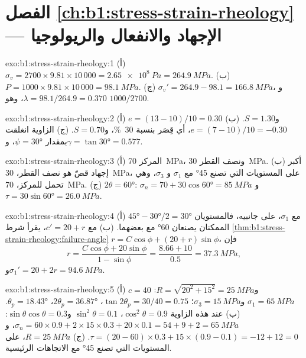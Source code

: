 \section*{الفصل \ref{ch:b1:stress-strain-rheology} --- الإجهاد والانفعال والريولوجيا}

\begin{solution}{exo:b1:stress-strain-rheology:1}
(أ) $\sigma_v = 2700\times9.81\times10\,000 = \qty{2.65e8}{Pa} = \qty{264.9}{MPa}$.
(ب) $P = 1000\times9.81\times10\,000 = \qty{98.1}{MPa}$. (ج) $\sigma_v' =
264.9 - 98.1 = \qty{166.8}{MPa}$، و$\lambda = 98.1/264.9 = 0.370$، وهو
$1000/2700$.
\end{solution}

\begin{solution}{exo:b1:stress-strain-rheology:2}
(أ) $e = (13-10)/10 = 0.30$ و$S = 1.30$. (ب) $e = (7-10)/10 = -0.30$، أي قِصَر
بنسبة \qty{30}{\percent}، و$S = 0.70$. (ج) الزاوية انغلقت بمقدار
$\psi = \ang{30}$، و$\gamma = \tan\ang{30} = 0.577$.
\end{solution}

\begin{solution}{exo:b1:stress-strain-rheology:3}
(أ) المركز \qty{70}{MPa}، ونصف القطر \qty{30}{MPa}. (ب) أكبر إجهاد قصّ هو نصف القطر، \qty{30}{MPa}، على المستويات التي تصنع \ang{45} مع $\sigma_1$ و
$\sigma_3$، وهي تحمل  للمركز، \qty{70}{MPa}. (ج)
$2\theta = \ang{60}$: $\sigma_n = 70 + 30\cos\ang{60} = \qty{85}{MPa}$ و
$\tau = 30\sin\ang{60} = \qty{26.0}{MPa}$.
\end{solution}

\begin{solution}{exo:b1:stress-strain-rheology:4}
(أ) $\ang{45} - \ang{30}/2 = \ang{30}$ مع $\sigma_1$، على جانبيه، فالمستويان الممكنان يصنعان \ang{60} مع بعضهما. (ب) مع $c' = 20 + r$، يقرأ شرط \cref{thm:b1:stress-strain-rheology:failure-angle}
$r = C\cos\phi + (20 + r)\sin\phi$، فإن
\[
  r = \frac{C\cos\phi + 20\sin\phi}{1 - \sin\phi} = \frac{8.66 + 10}{0.5}
    = \qty{37.3}{MPa},
\]
و$\sigma_1' = 20 + 2r = \qty{94.6}{MPa}$.
\end{solution}

\begin{solution}{exo:b1:stress-strain-rheology:5}
(أ) $c = 40$ و$R = \sqrt{20^2 + 15^2} = \qty{25}{MPa}$: $\sigma_1 =
\qty{65}{MPa}$ و$\sigma_3 = \qty{15}{MPa}$؛ $\tan2\theta_p = 30/40 = 0.75$،
$2\theta_p = \ang{36.87}$، $\theta_p = \ang{18.43}$. (ب) عند هذه الزاوية
$\cos^2\theta = 0.9$، $\sin^2\theta = 0.1$ و$\sin\theta\cos\theta = 0.3$:
$\sigma_n = 60\times0.9 + 2\times15\times0.3 + 20\times0.1 = 54 + 9 + 2 =
\qty{65}{MPa}$، و$\tau = (20-60)\times0.3 + 15\times(0.9-0.1) = -12 + 12 =
0$. (ج) $R = \qty{25}{MPa}$، على المستويات التي تصنع \ang{45} مع الاتجاهات
الرئيسية.
\end{solution}

